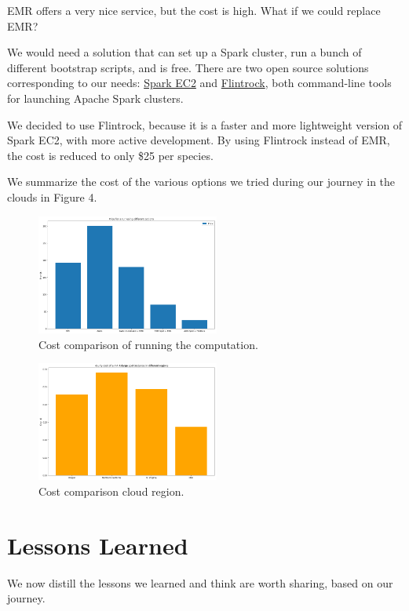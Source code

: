 \documentclass{acm_proc_article-sp}
\begin{document}
EMR offers a very nice service, but the cost is high. What if we could replace EMR?

We would need a solution that can set up a Spark cluster, run a bunch of different bootstrap scripts, and is free. There are two open source solutions corresponding to our needs: \href{https://github.com/amplab/spark-ec2}{Spark EC2} and \href{https://github.com/nchammas/flintrock}{Flintrock}, both command-line tools for launching Apache Spark clusters.

We decided to use Flintrock, because it is a faster and more lightweight version of Spark EC2, with more active development. 
By using Flintrock instead of EMR, the cost is reduced to only \$25 per species.

We summarize the cost of the various options we tried during our journey in the clouds in Figure 4.

\begin{figure}[h]
    \centering
    \includegraphics[width=6cm]{IMG/cost-comp-1.png}
    \caption{Cost comparison of running the computation.}
    \label{fig::cost-comp-1}
\end{figure}

\begin{figure}[h]
    \centering
    \includegraphics[width=6cm]{IMG/cost-comp-2.png}
    \caption{Cost comparison cloud region.}
    \label{fig::cost-comp-2}
\end{figure}

\section{Lessons Learned}\label{sec::lessons}
We now distill the lessons we learned and think are worth sharing, based on our journey.
\end{document}
